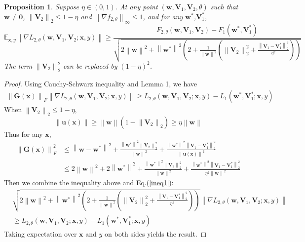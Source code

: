 \documentclass{article}
\theoremstyle{plain}
\newtheorem{prop}{Proposition}
\theoremstyle{definition}
\newcommand{\norm}[1]{\left\lVert#1\right\rVert}
\newcommand{\dis}{\displaystyle}
\begin{document}
\begin{prop}
	Suppose $\eta\in(0,1)$. At any point $(\mathbf{w},\mathbf{V}_1,\mathbf{V}_2,\theta)$ such that $\mathbf{w}\neq\mathbf{0}$, $\norm{\mathbf{V}_2}_2\leq 1-\eta$ and $\norm{\nabla f_{2,\theta}}_\infty\leq 1$, and for any $\mathbf{w}^*$,$\mathbf{V}_1^*$,
	\[\mathbb{E}_{\mathbf{x},y}\norm{\nabla L_{2,\theta}(\mathbf{w},\mathbf{V}_1,\mathbf{V}_2;\mathbf{x},y)}\geq\frac{F_{2,\theta}(\mathbf{w},\mathbf{V}_1,\mathbf{V}_2)-F_1(\mathbf{w}^*,\mathbf{V}_1^*)}{\sqrt{2\norm{\mathbf{w}}^2+\norm{\mathbf{w}^*}^2\left(2+\dis\frac{1}{\norm{\mathbf{w}}^2}\left(\norm{\mathbf{V}_2}_2^2+\frac{\norm{\mathbf{V}_1-\mathbf{V}_1^*}_2^2}{\eta^2}\right)\right)}}\]
	The term $\norm{\mathbf{V}_2}_2^2$ can be replaced by $(1-\eta)^2$.
\end{prop}

\begin{proof}
	Using Cauchy-Schwarz inequality and Lemma 1, we have
	\begin{align}
	\norm{\mathbf{G}(\mathbf{x})}_F\norm{\nabla L_{2,\theta}(\mathbf{w},\mathbf{V}_1,\mathbf{V}_2;\mathbf{x},y)}\geq L_{2,\theta}(\mathbf{w},\mathbf{V}_1,\mathbf{V}_2;\mathbf{x},y)-L_1(\mathbf{w}^*,\mathbf{V}_1^*;\mathbf{x},y)
	\label{ineq1}
	\end{align}
	When $\norm{\mathbf{V}_2}_2\leq 1-\eta$,
	\[\norm{\mathbf{u}(\mathbf{x})}\geq \norm{\mathbf{w}}\left(1-\norm{\mathbf{V}_2}_2\right)\geq\eta\norm{\mathbf{w}}\]
	Thus for any $\mathbf{x}$,
	\begin{align*}
	\norm{\mathbf{G}(\mathbf{x})}_F^2&\leq\norm{\mathbf{w}-\mathbf{w}^*}^2+\frac{\norm{\mathbf{w^*}}^2\norm{\mathbf{V}_2}_2^2}{\norm{\mathbf{w}}^2}+\frac{\norm{\mathbf{w^*}}^2\norm{\mathbf{V}_1-\mathbf{V}_1^*}_2^2}{\norm{\mathbf{u}(\mathbf{x})}^2}\\
	&\leq2\norm{\mathbf{w}}^2+2\norm{\mathbf{w}^*}^2+\frac{\norm{\mathbf{w}^*}^2\norm{\mathbf{V}_2}_2^2}{\norm{\mathbf{w}}^2}+\frac{\norm{\mathbf{w^*}}^2\norm{\mathbf{V}_1-\mathbf{V}_1^*}_2^2}{\eta^2\norm{\mathbf{w}}^2}
	\end{align*}
	Then we combine the inequality above and Eq.(\ref{ineq1}):
	\begin{align*}
	&\sqrt{2\norm{\mathbf{w}}^2+\norm{\mathbf{w}^*}^2\left(2+\frac{1}{\norm{\mathbf{w}}^2}\left(\norm{\mathbf{V}_2}_2^2+\frac{\norm{\mathbf{V}_1-\mathbf{V}_1^*}_2^2}{\eta^2}\right)\right)}\norm{\nabla L_{2,\theta}(\mathbf{w},\mathbf{V}_1,\mathbf{V}_2;\mathbf{x},y)}\\
	&\geq L_{2,\theta}(\mathbf{w},\mathbf{V}_1,\mathbf{V}_2;\mathbf{x},y)-L_1(\mathbf{w}^*,\mathbf{V}_1^*;\mathbf{x},y)
	\end{align*}
	Taking expectation over $\mathbf{x}$ and $y$ on both sides yields the result.
\end{proof}
\end{document}
